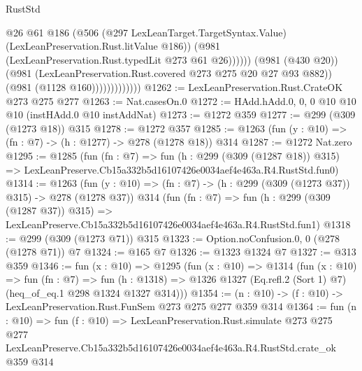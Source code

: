 \begin{lexlean}{RustStd}
\begin{coremodule}
                                  @26
                                  @61
                                  @186
                                  (@506
                                    (@297 LexLeanTarget.TargetSyntax.Value)
                                    (LexLeanPreservation.Rust.litValue @186))
                                  (@981 (LexLeanPreservation.Rust.typedLit @273 @61 @26))))))
                          (@981 (@430 @20))
                          (@981 (LexLeanPreservation.Rust.covered @273 @275 @20 @27 @93 @882))
                          (@981 (@1128 @160)))))))))))))
@1262 := LexLeanPreservation.Rust.CrateOK @273 @275 @277
@1263 := Nat.casesOn.{0}
@1272 := HAdd.hAdd.{0, 0, 0} @10 @10 @10 (instHAdd.{0} @10 instAddNat)
@1273 := @1272 @359
@1277 := @299 (@309 (@1273 @18)) @315
@1278 := @1272 @357
@1285 := @1263 (fun (y : @10) => (fn : @7) -> (h : @1277) -> @278 (@1278 @18)) @314
@1287 := @1272 Nat.zero
@1295 := @1285
    (fun (fn : @7) =>
    fun (h : @299 (@309 (@1287 @18)) @315) =>
    LexLeanPreserve.Cb15a332b5d16107426e0034aef4e463a.R4.RustStd.fun0)
@1314 := @1263
    (fun (y : @10) => (fn : @7) -> (h : @299 (@309 (@1273 @37)) @315) -> @278 (@1278 @37))
    @314
    (fun (fn : @7) =>
    fun (h : @299 (@309 (@1287 @37)) @315) =>
    LexLeanPreserve.Cb15a332b5d16107426e0034aef4e463a.R4.RustStd.fun1)
@1318 := @299 (@309 (@1273 @71)) @315
@1323 := Option.noConfusion.{0, 0} (@278 (@1278 @71)) @7
@1324 := @165 @7
@1326 := @1323 @1324 @7
@1327 := @313 @359
@1346 := fun (x : @10) =>
  @1295
    (fun (x : @10) =>
    @1314
      (fun (x : @10) =>
      fun (fn : @7) =>
      fun (h : @1318) =>
      @1326 @1327 (Eq.refl.{2} (Sort 1) @7) (heq_of_eq.{1} @298 @1324 @1327 @314)))
@1354 := (n : @10) -> (f : @10) -> LexLeanPreservation.Rust.FunSem @273 @275 @277 @359 @314
@1364 := fun (n : @10) =>
  fun (f : @10) =>
  LexLeanPreservation.Rust.simulate
    @273
    @275
    @277
    LexLeanPreserve.Cb15a332b5d16107426e0034aef4e463a.R4.RustStd.crate_ok
    @359
    @314
\end{coremodule}
\end{lexlean}
